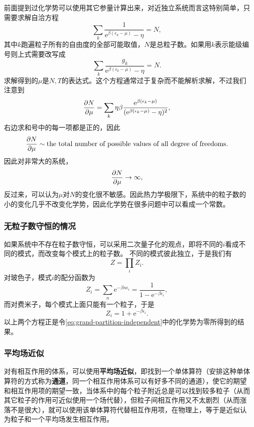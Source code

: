 \documentclass[hyperref, UTF8, a4paper]{ctexart}
\newcommand*{\ee}{\mathrm{e}}
\begin{document}
前面提到过化学势可以使用其它参量计算出来，对近独立系统而言这特别简单，只需要求解自洽方程
\begin{equation}
    \sum_k \frac{1}{\ee^{\beta (\epsilon_k - \mu)} - \eta} = N,
\end{equation}
其中$k$跑遍粒子所有的自由度的全部可能取值，$N$是总粒子数。如果用$k$表示能级编号则上式需要改写成
\[
    \sum_k \frac{g_k}{\ee^{\beta (\epsilon_k - \mu)} - \eta} = N.
\]
求解得到的$\mu$是$N,T$的表达式。这个方程通常过于复杂而不能解析求解，不过我们注意到
\[
    \pdv{N}{\mu} = \sum_k \eta \beta \frac{\ee^{\beta (\epsilon_k - \mu)}}{(\ee^{ \beta (\epsilon_k - \mu)} - \eta)^2},
\]
右边求和号中的每一项都是正的，因此
\[
    \pdv{N}{\mu} \sim \text{the total number of possible values of all degree of freedoms}.
\]
因此对非常大的系统，
\[
    \pdv{N}{\mu} \to \infty,
\]
反过来，可以认为$\mu$对$N$的变化很不敏感。因此热力学极限下，系统中的粒子数的小的变化几乎不改变化学势，因此化学势在很多问题中可以看成一个常数。

\subsubsection{无粒子数守恒的情况}

如果系统中不存在粒子数守恒，可以采用二次量子化的观点，即将不同的$i$看成不同的模式，而改变每个模式上的粒子数。
不同的模式彼此独立，于是我们有
\begin{equation}
    Z = \prod_i Z_i.
\end{equation}
对玻色子，模式$i$的配分函数为
\begin{equation}
    Z_i = \sum_n \ee^{-\beta n \epsilon_i} = \frac{1}{1 - \ee^{-\beta \epsilon_i}},
\end{equation}
而对费米子，每个模式上面只能有一个粒子，于是
\begin{equation}
    Z_i = 1 + \ee^{- \beta \epsilon_i}.
\end{equation}
以上两个方程正是令\eqref{eq:grand-partition-independent}中的化学势为零所得到的结果。

\subsubsection{平均场近似}

对有相互作用的体系，可以使用\textbf{平均场近似}，即找到一个单体算符（安排这种单体算符的方式称为\textbf{通道}，同一个相互作用体系可以有好多不同的通道），使它的期望和相互作用项的期望一致，当体系中的每个粒子附近总是可以找到较多粒子（从而其它粒子的作用可近似使用一个场代替），但粒子间相互作用又不太剧烈（从而涨落不是很大），就可以使用该单体算符代替相互作用项，在物理上，等于是近似认为粒子和一个平均场发生相互作用。
\end{document}
